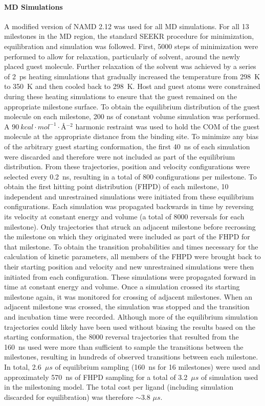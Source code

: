 \paragraph{MD Simulations}
\par A modified version of NAMD 2.12 was used for all MD simulations\cite{Phillips2005}.
For all 13 milestones in the MD region, the standard SEEKR procedure for
minimization, equilibration and simulation was followed. First, 5000 steps of
minimization were performed to allow for relaxation, particularly of solvent,
around the newly placed guest molecule. Further relaxation of the solvent was
achieved by a series of 2~ps heating simulations that gradually increased the
temperature from 298~K to 350~K and then cooled back to 298~K. Host and guest atoms
were constrained during these heating simulations to ensure that the guest
remained on the appropriate milestone surface. To obtain the equilibrium
distribution of the guest molecule on each milestone, 200 ns of constant
volume simulation was performed. A $\SI{90}{kcal\cdot mol^{-1}\cdot\angstrom^{-2}}$
harmonic restraint was used to hold the COM of the guest molecule at the appropriate
distance from the binding site. To minimize any bias of the arbitrary guest
starting conformation, the first 40~ns of each simulation were discarded and
therefore were not included as part of the equilibrium distribution. From these
trajectories, position and velocity configurations were selected every 0.2~ns,
resulting in a total of 800 configurations per milestone. To obtain the first
hitting point distribution (FHPD) of each milestone, 10 independent and
unrestrained simulations were initiated from these equilibrium configurations.
Each simulation was propagated backwards in time by reversing its velocity at
constant energy and volume (a total of 8000 reversals for each milestone).
Only trajectories that struck an adjacent milestone before recrossing the
milestone on which they originated were included as part of the FHPD for that
milestone. To obtain the transition probabilities and times necessary for the
calculation of kinetic parameters, all members of the FHPD were brought back to
their starting position and velocity and new unrestrained simulations were then
initiated from each configuration. These simulations were propagated forward in
time at constant energy and volume. Once a simulation crossed its starting
milestone again, it was monitored for crossing of adjacent milestones.
When an adjacent milestone was crossed, the simulation was stopped and the
transition and incubation time were recorded. Although more of the equilibrium
simulation trajectories could likely have been used without biasing the results
based on the starting conformation, the 8000 reversal trajectories that resulted
from the 160~ns used were more than sufficient to sample the transitions between
the milestones, resulting in hundreds of observed transitions between each milestone.
In total, 2.6~${\mu}s$ of equilibrium sampling (160~ns for 16 milestones) were
used and approximately 570~ns of FHPD sampling for a total of 3.2~${\mu}s$ of
simulation used in the milestoning model. The total cost per ligand (including
simulation discarded for equilibration) was therefore $\sim$3.8 ${\mu}s$.

